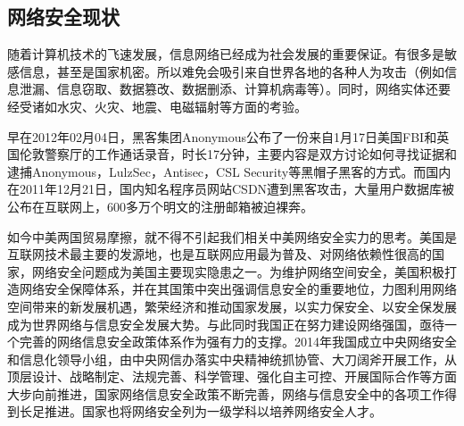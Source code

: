 \documentclass{article}
\begin{document}
\subsection{网络安全现状}
随着计算机技术的飞速发展，信息网络已经成为社会发展的重要保证。有很多是敏感信息，甚至是国家机密。所以难免会吸引来自世界各地的各种人为攻击（例如信息泄漏、信息窃取、数据篡改、数据删添、计算机病毒等）。同时，网络实体还要经受诸如水灾、火灾、地震、电磁辐射等方面的考验\citep{C}。\par
早在2012年02月04日，黑客集团Anonymous公布了一份来自1月17日美国FBI和英国伦敦警察厅的工作通话录音，时长17分钟，主要内容是双方讨论如何寻找证据和逮捕Anonymous，LulzSec，Antisec，CSL Security等黑帽子黑客的方式\citep{C}。而国内在2011年12月21日，国内知名程序员网站CSDN遭到黑客攻击，大量用户数据库被公布在互联网上，600多万个明文的注册邮箱被迫裸奔。\par
如今中美两国贸易摩擦，就不得不引起我们相关中美网络安全实力的思考。美国是互联网技术最主要的发源地，也是互联网应用最为普及、对网络依赖性很高的国家，网络安全问题成为美国主要现实隐患之一。为维护网络空间安全，美国积极打造网络安全保障体系，并在其国策中突出强调信息安全的重要地位，力图利用网络空间带来的新发展机遇，繁荣经济和推动国家发展，以实力保安全、以安全保发展成为世界网络与信息安全发展大势。与此同时我国正在努力建设网络强国，亟待一个完善的网络信息安全政策体系作为强有力的支撑。2014年我国成立中央网络安全和信息化领导小组，由中央网信办落实中央精神统抓协管、大刀阔斧开展工作，从顶层设计、战略制定、法规完善、科学管理、强化自主可控、开展国际合作等方面大步向前推进，国家网络信息安全政策不断完善，网络与信息安全中的各项工作得到长足推进。国家也将网络安全列为一级学科以培养网络安全人才。\par
\end{document}
